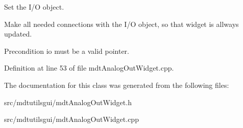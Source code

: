 Set the I/O object. 

Make all needed connections with the I/O object, so that widget is allways updated.

\begin{DoxyPrecond}{Precondition}
io must be a valid pointer. 
\end{DoxyPrecond}


Definition at line 53 of file mdtAnalogOutWidget.cpp.



The documentation for this class was generated from the following files:\begin{DoxyCompactItemize}
\item 
src/mdtutilsgui/mdtAnalogOutWidget.h\item 
src/mdtutilsgui/mdtAnalogOutWidget.cpp\end{DoxyCompactItemize}
